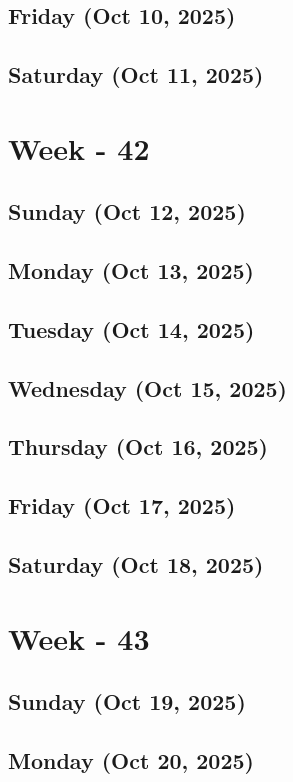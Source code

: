 \subsection*{Friday (Oct 10, 2025)}
\subsection*{Saturday (Oct 11, 2025)}

\section{Week - 42}
\subsection*{Sunday (Oct 12, 2025)}
\subsection*{Monday (Oct 13, 2025)}
\subsection*{Tuesday (Oct 14, 2025)}
\subsection*{Wednesday (Oct 15, 2025)}
\subsection*{Thursday (Oct 16, 2025)}
\subsection*{Friday (Oct 17, 2025)}
\subsection*{Saturday (Oct 18, 2025)}

\section{Week - 43}
\subsection*{Sunday (Oct 19, 2025)}
\subsection*{Monday (Oct 20, 2025)}
